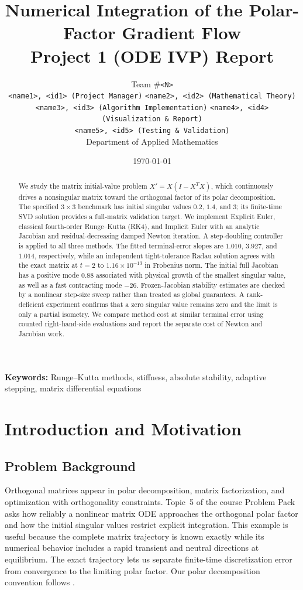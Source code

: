 \documentclass[11pt,a4paper]{article}
\title{\textbf{Numerical Integration of the Polar-Factor Gradient Flow}\\[2mm]
\large Project 1 (ODE IVP) Report}
\author{
    Team \#\texttt{<N>} \\
    \small \texttt{<name1>, <id1> (Project Manager)} \quad
    \texttt{<name2>, <id2> (Mathematical Theory)} \\
    \small \texttt{<name3>, <id3> (Algorithm Implementation)} \quad
    \texttt{<name4>, <id4> (Visualization \& Report)} \\
    \small \texttt{<name5>, <id5> (Testing \& Validation)} \\
    \small Department of Applied Mathematics
}
\date{\today}
\theoremstyle{definition}
\theoremstyle{remark}
\begin{document}
\maketitle

\begin{abstract}
\noindent
We study the matrix initial-value problem
$X'=X(I-X^TX)$, which continuously drives a nonsingular matrix toward
the orthogonal factor of its polar decomposition. The specified
$3\times3$ benchmark has initial singular values $0.2$, $1.4$, and $3$;
its finite-time SVD solution provides a full-matrix validation target.
We implement Explicit Euler, classical fourth-order Runge--Kutta (RK4),
and Implicit Euler with an analytic Jacobian and residual-decreasing
damped Newton iteration. A step-doubling controller is applied to all
three methods. The fitted terminal-error slopes are $1.010$, $3.927$,
and $1.014$, respectively, while an independent tight-tolerance Radau
solution agrees with the exact matrix at $t=2$ to $1.16\times10^{-13}$
in Frobenius norm. The initial full Jacobian has a positive mode
$0.88$ associated with physical growth of the smallest singular
value, as well as a fast contracting mode $-26$. Frozen-Jacobian
stability estimates are checked by a nonlinear step-size sweep rather
than treated as global guarantees. A rank-deficient experiment confirms
that a zero singular value remains zero and the limit is only a partial
isometry. We compare method cost at similar terminal error using
counted right-hand-side evaluations and report the separate cost of
Newton and Jacobian work.
\end{abstract}

\noindent\textbf{Keywords:} Runge--Kutta methods, stiffness, absolute stability,
adaptive stepping, matrix differential equations

\tableofcontents
\newpage

\section{Introduction and Motivation}

\subsection{Problem Background}
Orthogonal matrices appear in polar decomposition, matrix
factorization, and optimization with orthogonality constraints. Topic~5
of the course Problem Pack asks how reliably a nonlinear matrix ODE
approaches the orthogonal polar factor and how the initial singular
values restrict explicit integration. This example is useful because
the complete matrix trajectory is known exactly while its numerical
behavior includes a rapid transient and neutral directions at
equilibrium. The exact trajectory lets us separate finite-time
discretization error from convergence to the limiting polar factor.
Our polar decomposition convention follows \cite{higham1986}.
\end{document}
